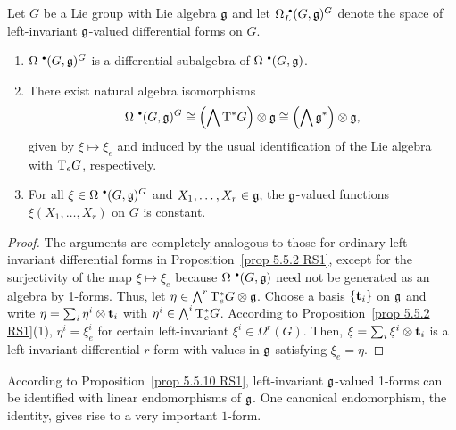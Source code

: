 \begin{prop}[{{\cite[Prop.~5.5.10]{RS1}}}]\label{prop 5.5.10 RS1}
    Let $G$ be a Lie group with Lie algebra $\frakg$ and let $\Omega^{\smbullet }_L(G,\frakg)^G$ denote the space of left-invariant $\frakg$-valued differential forms on $G$.
    \begin{enumerate}
        \item $\Omega^{\smbullet }(G,\frakg)^G$ is a differential subalgebra of $\Omega^{\smbullet }(G,\frakg)$.
        \item There exist natural algebra isomorphisms
        \[\Omega^{\smbullet }(G,\frakg)^G\cong \left(\bigwedge \T^\ast G\right)\otimes\frakg\cong \left(\bigwedge\frakg^\ast\right)\otimes\frakg,\]
        given by $\xi\mapsto \xi_e$ and induced by the usual identification of the Lie algebra with $\T_eG$, respectively.
        \item For all $\xi\in\Omega^{\smbullet }(G,\frakg)^G$ and $X_1,\ldots,X_r\in\frakg$, the $\frakg$-valued functions $\xi(X_1,\ldots,X_r)$ on $G$ is constant.
    \end{enumerate}
\end{prop}
\begin{proof}
    The arguments are completely analogous to those for ordinary left-invariant differential forms in Proposition~\ref{prop 5.5.2 RS1}, except for the surjectivity of the map $\xi\mapsto \xi_e$ because $\Omega^{\smbullet }(G,\frakg)$ need not be generated as an algebra by 1-forms. Thus, let $\eta\in\bigwedge^r \T^\ast_eG\otimes \frakg$. Choose a basis $\{\bf{t}_i\}$ on $\frakg$ and write $\eta=\sum_i\eta^i\otimes \bf{t}_i$ with $\eta^i\in\bigwedge^i\T^\ast_eG$. According to Proposition~\ref{prop 5.5.2 RS1}(1), $\eta^i=\xi^i_e$ for certain left-invariant $\xi^i\in\Omega^r(G)$. Then, $\xi=\sum_i\xi^i\otimes \bf{t}_i$ is a left-invariant differential $r$-form with values in $\frakg$ satisfying $\xi_e=\eta$.
\end{proof}

According to Proposition~\ref{prop 5.5.10 RS1}, left-invariant $\frakg$-valued 1-forms can be identified with linear endomorphisms of $\frakg$. One canonical endomorphism, the identity, gives rise to a very important $1$-form.

